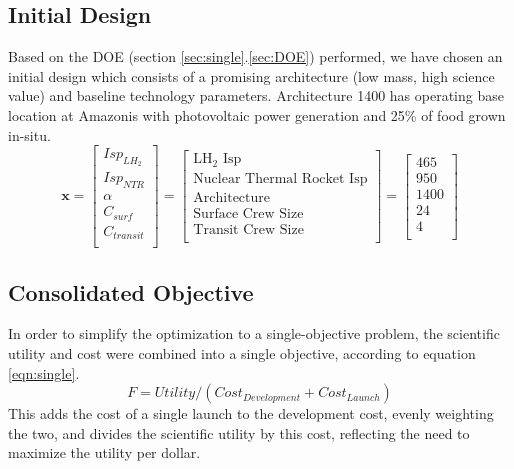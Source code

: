 \documentclass[]{aiaa-pretty}
\begin{document}
\subsection{Initial Design}
Based on the DOE (section \ref{sec:single}.\ref{sec:DOE}) performed, we have chosen an initial design which consists of a promising architecture (low mass, high science value) and baseline technology parameters. Architecture 1400 has operating base location at Amazonis with photovoltaic power generation and 25\% of food grown in-situ.
\begin{equation*}
\mathbf{x}=
\begin{bmatrix}
Isp_{LH_2}\\
Isp_{NTR}\\
\alpha\\
C_{surf}\\
C_{transit}\\
\end{bmatrix}
=
\begin{bmatrix}
\mbox{LH}_2\mbox{ Isp}\\
\mbox{Nuclear Thermal Rocket Isp}\\
\mbox{Architecture}\\
\mbox{Surface Crew Size}\\
\mbox{Transit Crew Size}\\
\end{bmatrix}
=
\begin{bmatrix}
465\\
950\\
1400\\
24\\
4\\
\end{bmatrix}
\end{equation*}

\subsection{Consolidated Objective}
In order to simplify the optimization to a single-objective problem, the scientific utility and cost were combined into a single objective, according to equation \ref{eqn:single}.
\begin{equation}
F = Utility/(Cost_{Development}+Cost_{Launch})
\label{eqn:single}
\end{equation}
This adds the cost of a single launch to the development cost, evenly weighting the two, and divides the scientific utility by this cost, reflecting the need to maximize the utility per dollar.
\end{document}
